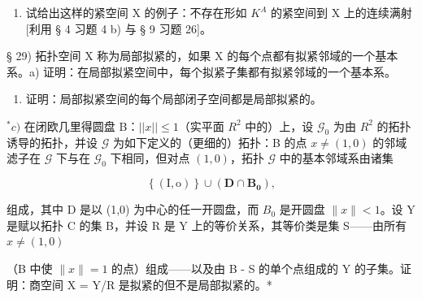 \begin{enumerate}
\def\labelenumi{\alph{enumi})}
\setcounter{enumi}{1}
\tightlist
\item
  试给出这样的紧空间 X 的例子：不存在形如 \(K^{A}\) 的紧空间到 X 上的连续满射{[}利用 § 4 习题 4 b) 与 § 9 习题 26{]}。
\end{enumerate}

§ 29) 拓扑空间 X 称为局部拟紧的，如果 X 的每个点都有拟紧邻域的一个基本系。a) 证明：在局部拟紧空间中，每个拟紧子集都有拟紧邻域的一个基本系。

\begin{enumerate}
\def\labelenumi{\alph{enumi})}
\setcounter{enumi}{1}
\tightlist
\item
  证明：局部拟紧空间的每个局部闭子空间都是局部拟紧的。
\end{enumerate}

\(^{*}c)\) 在闭欧几里得圆盘 B：\(||x|| \leqslant 1\)（实平面 \(R^{2}\) 中的）上，设 \(\mathcal{G}_{0}\) 为由 \(R^{2}\) 的拓扑诱导的拓扑，并设 \(\mathcal{G}\) 为如下定义的（更细的）拓扑：B 的点 \(x \neq (1,0)\) 的邻域滤子在 \(\mathcal{G}\) 下与在 \(\mathcal{G}_{0}\) 下相同，但对点 \((1,0)\)，拓扑 \(\mathcal{G}\) 中的基本邻域系由诸集

\[
\left\{\left(\mathrm{I}, \mathrm{o}\right) \right\} \cup \left(\mathbf {D} \cap \mathbf {B} _ {\mathbf {0}}\right),
\]

组成，其中 D 是以 (1,0) 为中心的任一开圆盘，而 \(B_{0}\) 是开圆盘 \(\|x\|<1\)。设 Y 是赋以拓扑 C 的集 B，并设 R 是 Y 上的等价关系，其等价类是集 S——由所有 \(x\neq(1,0)\)

（B 中使 \(\|x\| = 1\) 的点）组成——以及由 B - S 的单个点组成的 Y 的子集。证明：商空间 X = Y/R 是拟紧的但不是局部拟紧的。*

